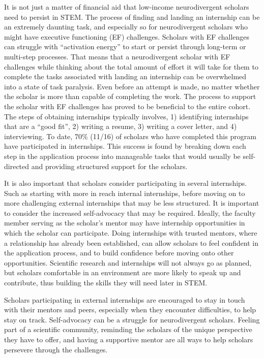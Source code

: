 \documentclass[11.5pt]{sig-alternate}
\begin{document}
\begin{large}
It is not just a matter of financial aid that low-income neurodivergent scholars need to persist in STEM. The process of finding and landing an internship can be an extremely daunting task, and especially so for neurodivergent scholars who might have executive functioning (EF) challenges. Scholars with EF challenges can struggle with “activation energy” to start or persist through long-term or multi-step processes. That means that a neurodivergent scholar with EF challenges while thinking about the total amount of effort it will take for them to complete the tasks associated with landing an internship can be overwhelmed into a state of task paralysis. Even before an attempt is made, no matter whether the scholar is more than capable of completing the work. The process to support the scholar with EF challenges has proved to be beneficial to the entire cohort. The steps of obtaining internships typically involves, 1) identifying internships that are a “good fit”, 2) writing a resume, 3) writing a cover letter, and 4) interviewing. To date, 70\% (11/16) of scholars who have completed this program have participated in internships. This success is found by breaking down each step in the application process into manageable tasks that would usually be self-directed and providing structured support for the scholars. 

It is also important that scholars consider participating in several internships. Such as starting with more in reach internal internships, before moving on to more challenging external internships that may be less structured. It is important to consider the increased self-advocacy that may be required. Ideally, the faculty member serving as the scholar’s mentor may have internship opportunities in which the scholar can participate. Doing internships with trusted mentors, where a relationship has already been established, can allow scholars to feel confident in the application process, and to build confidence before moving onto other opportunities. Scientific research and internships will not always go as planned, but scholars comfortable in an environment are more likely to speak up and contribute, thus building the skills they will need later in STEM.

Scholars participating in external internships are encouraged to stay in touch with their mentors and peers, especially when they encounter difficulties, to help stay on track. Self-advocacy can be a struggle for neurodivergent scholars. Feeling part of a scientific community, reminding the scholars of the unique perspective they have to offer, and having a supportive mentor are all ways to help scholars persevere through the challenges.


\end{large}
\end{document}
